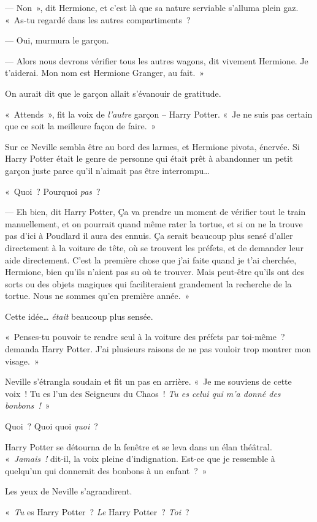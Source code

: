 --- Non~», dit Hermione, et c'est là que sa nature serviable s'alluma plein gaz. «~As-tu regardé dans les autres compartiments~?

--- Oui, murmura le garçon.

--- Alors nous devrons vérifier tous les autres wagons, dit vivement Hermione. Je t'aiderai. Mon nom est Hermione Granger, au fait.~»

On aurait dit que le garçon allait s'évanouir de gratitude.

«~Attends~», fit la voix de \emph{l'autre} garçon -- Harry Potter. «~Je ne suis pas certain que ce soit la meilleure façon de faire.~»

Sur ce Neville sembla être au bord des larmes, et Hermione pivota, énervée. Si Harry Potter était le genre de personne qui était prêt à abandonner un petit garçon juste parce qu'il n'aimait pas être interrompu…

«~Quoi~? Pourquoi \emph{pas}~?

--- Eh bien, dit Harry Potter, Ça va prendre un moment de vérifier tout le train manuellement, et on pourrait quand même rater la tortue, et si on ne la trouve pas d'ici à Poudlard il aura des ennuis. Ça serait beaucoup plus sensé d'aller directement à la voiture de tête, où se trouvent les préfets, et de demander leur aide directement. C'est la première chose que j'ai faite quand je t'ai cherchée, Hermione, bien qu'ils n'aient pas su où te trouver. Mais peut-être qu'ils ont des sorts ou des objets magiques qui faciliteraient grandement la recherche de la tortue. Nous ne sommes qu'en première année.~»

Cette idée… \emph{était} beaucoup plus sensée.

«~Penses-tu pouvoir te rendre seul à la voiture des préfets par toi-même~? demanda Harry Potter. J'ai plusieurs raisons de ne pas vouloir trop montrer mon visage.~»

Neville s'étrangla soudain et fit un pas en arrière. «~Je me souviens de cette voix~! Tu es l'un des Seigneurs du Chaos~! \emph{Tu es celui qui m'a donné des bonbons~!}~»

Quoi~? Quoi quoi \emph{quoi}~?

Harry Potter se détourna de la fenêtre et se leva dans un élan théâtral. «~\emph{Jamais~!} dit-il, la voix pleine d'indignation. Est-ce que je ressemble à quelqu'un qui donnerait des bonbons à un enfant~?~»

Les yeux de Neville s'agrandirent.

«~\emph{Tu} es Harry Potter~? \emph{Le} Harry Potter~? \emph{Toi}~?


